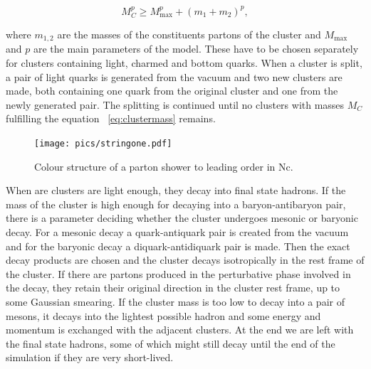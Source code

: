 \begin{equation}
M_C^p \geq M_\mathrm{max}^p  + \left( m_1 + m_2\right)^p,
\label{eq:clustermass}
\end{equation}

where $m_{1,2}$ are the masses of the constituents partons of the cluster and $M_\mathrm{max}$ and $p$ are the main parameters of the model. These have to be chosen separately for clusters containing light, charmed and bottom quarks. When a cluster is split, a pair of light quarks is generated from the vacuum and two new clusters are made, both containing one quark from the original cluster and one from the newly generated pair. The splitting is continued until no clusters with masses $M_C$ fulfilling the equation ~\ref{eq:clustermass} remains.

\begin{figure}
\centering
\texttt{[image: pics/stringone.pdf]}
\caption[]{ Colour structure of a parton shower to leading order in Nc.
\cite{eventGenerators} }
\label{fig:fluxtube}
\end{figure}

When are clusters are light enough, they decay into final state hadrons. If the mass of the cluster is high enough for decaying into a baryon-antibaryon pair, there is a parameter deciding whether the cluster undergoes mesonic or baryonic decay. For a mesonic decay a quark-antiquark pair is created from the vacuum and for the baryonic decay a diquark-antidiquark pair is made. Then the exact decay products are chosen and the cluster decays isotropically in the rest frame of the cluster. If there are partons produced in the perturbative phase involved in the decay, they retain their original direction in the cluster rest frame, up to some Gaussian smearing. If the cluster mass is too low to decay into a pair of mesons, it decays into the lightest possible hadron and some energy and momentum is exchanged with the adjacent clusters. At the end we are left with the final state hadrons, some of which might still decay until the end of the simulation if they are very short-lived.~\cite{} 

